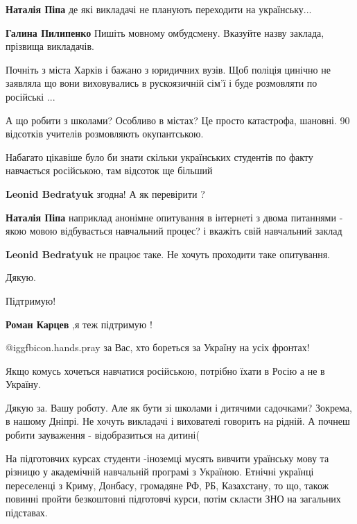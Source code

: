 \begin{itemize}
\begin{itemize}
\begin{itemize}
\textbf{Наталія Піпа} де які викладачі не планують переходити на українську...
\end{itemize} %

\textbf{Галина Пилипенко} Пишіть мовному омбудсмену. Вказуйте назву заклада, прізвища викладачів.


Почніть з міста Харків і бажано з юридичних вузів. Щоб поліція цинічно не
заявляла що вони виховувались в рускоязичній сім'ї і буде розмовляти по
російські ...

\end{itemize} %

А що робити з школами? Особливо в містах? Це просто катастрофа, шановні.
90 відсотків учителів розмовляють окупантською.

Набагато цікавіше було би знати скільки українських студентів по факту
навчається російською, там відсоток ще більший

\begin{itemize} %
\textbf{Leonid Bedratyuk} згодна! А як перевірити ?

\textbf{Наталія Піпа} наприклад анонімне опитування в інтернеті з двома питаннями - якою мовою відбувається навчальний процес? і вкажіть свій навчальний заклад


\textbf{Leonid Bedratyuk} не працює таке. Не хочуть проходити таке опитування.
\end{itemize} %

Дякую.

Підтримую!

\textbf{Роман Карцев} ,я теж підтримую !

 @igg{fbicon.hands.pray}  за Вас, хто бореться за Україну на усіх фронтах!

Якщо комусь хочеться навчатися російською, потрібно їхати в Росію а не в Україну.


Дякую за. Вашу роботу. Але як бути зі школами і дитячими садочками? Зокрема, в
нашому Дніпрі. Не хочуть викладачі і вихователі говорить на рідній. А почнеш
робити зауваження - відобразиться на дитині(


На підготовчих курсах студенти -іноземці мусять вивчити ураїнську мову та
різницю у академічній навчальній програмі з Україною. Етнічні українці
переселенці з Криму, Донбасу, громадяне РФ, РБ, Казахстану, то що, також
повинні пройти безкоштовні підготовчі курси, потім скласти ЗНО на загальних
підставах.



\end{itemize}
